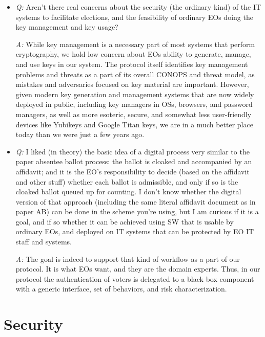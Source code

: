 \documentclass[12pt,letter]{article}
\begin{document}
\begin{itemize}

    \item \emph{Q:} Aren't there real concerns about the security (the ordinary kind) of the IT systems to facilitate elections, and the feasibility of ordinary EOs doing the key management and key usage?

    \emph{A:} While key management is a necessary part of most systems that perform cryptography, we hold low concern about EOs ability to generate, manage, and use keys in our system.  The protocol itself identifies key management problems and threats as a part of its overall CONOPS and threat model, as mistakes and adversaries focused on key material are important. However, given modern key generation and management systems that are now widely deployed in public, including key managers in OSs, browsers, and password managers, as well as more esoteric, secure, and somewhat less user-friendly devices like Yubikeys and Google Titan keys, we are in a much better place today than we were just a few years ago.

    \item \emph{Q:} I liked (in theory) the basic idea of a digital process very similar to the paper absentee ballot process: the ballot is cloaked and accompanied by an affidavit; and it is the EO's responsibility to decide (based on the affidavit and other stuff) whether each ballot is admissible, and only if so is the cloaked ballot queued up for counting. I don't know whether the digital version of that approach (including the same literal affidavit document as in paper AB) can be done in the scheme you're using, but I am curious if it is a goal, and if so whether it can be achieved using SW that is usable by ordinary EOs, and deployed on IT systems that can be protected by EO IT staff and systems.

    \emph{A:} The goal is indeed to support that kind of workflow as a part of our protocol.  It is what EOs want, and they are the domain experts.  Thus, in our protocol the authentication of voters is delegated to a black box component with a generic interface, set of behaviors, and risk characterization.

\end{itemize}

\section{Security}
\end{document}
